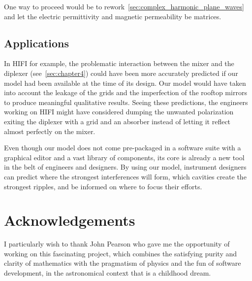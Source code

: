 \begin{refsection}
One way to proceed would be to rework~\cref{sec:complex_harmonic_plane_waves} and let the electric permittivity and magnetic permeability be matrices.



\subsection{Applications}
In HIFI for example, the problematic interaction between the mixer and the diplexer (see~\cref{sec:chapter4}) could have been more accurately predicted if our model had been available at the time of its design.
Our model would have taken into account the leakage of the grids and the imperfection of the rooftop mirrors to produce meaningful qualitative results.
Seeing these predictions, the engineers working on HIFI might have considered dumping the unwanted polarization exiting the diplexer with a grid and an absorber instead of letting it reflect almost perfectly on the mixer.

Even though our model does not come pre-packaged in a software suite with a graphical editor and a vast library of components, its core is already a new tool in the belt of engineers and designers.
By using our model, instrument designers can predict where the strongest interferences will form, which cavities create the strongest ripples, and be informed on where to focus their efforts.


\section*{Acknowledgements}
I particularly wish to thank John Pearson who gave me the opportunity of working on this fascinating project, which combines the satisfying purity and clarity of mathematics with the pragmatism of physics and the fun of software development, in the astronomical context that is a childhood dream.
\printbibliography[heading=subbibliography]
\end{refsection}
